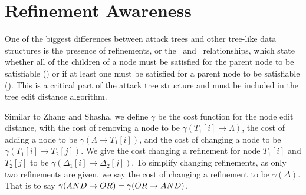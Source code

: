 \section{Refinement Awareness}

One of the biggest differences between attack trees and other tree-like data structures is the presence of refinements, or the \AND\ and \OR\ relationships, which state whether all of the children of a node must be satisfied for the parent node to be satisfiable (\AND) or if at least one must be satisfied for a parent node to be satisfiable (\OR). This is a critical part of the attack tree structure and must be included in the tree edit distance algorithm.




\begin{definition}\label{def:cost-function}
Similar to Zhang and Shasha, we define $\gamma$ be the cost function for the node edit distance, with the cost of removing a node to be $\gamma(T_1[i] \rightarrow {\Lambda})$, the cost of adding a node to be $\gamma({\Lambda}\rightarrow T_1[i])$, and the cost of changing a node to be $\gamma(T_1[i] \rightarrow T_2[j])$. We give the cost changing a refinement for node  $T_1[i]$ and $T_2[j]$ to be $\gamma(\Delta_1[i] \rightarrow \Delta_2[j])$. To simplify changing refinements, as only two refinements are given, we say the cost of changing a refinement to be $\gamma(\Delta)$. That is to say $\gamma(AND \rightarrow OR) = \gamma(OR \rightarrow AND)$.
\end{definition}



